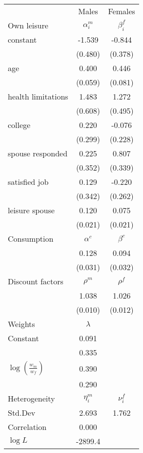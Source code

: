 \begin{tabular}{lcc} 
\hline\hline 
 & Males & Females \\ 
Own leisure & $\alpha_{i}^{m}$ & $\beta_{i}^{f}$ \\ 
constant & -1.539 & -0.844 \\ 
 & (0.480) & (0.378) \\ 
age & 0.400 & 0.446 \\ 
 & (0.059) & (0.081) \\ 
health limitations & 1.483 & 1.272 \\ 
 & (0.608) & (0.495) \\ 
college & 0.220 & -0.076 \\ 
 & (0.299) & (0.228) \\ 
spouse responded & 0.225 & 0.807 \\ 
 & (0.352) & (0.339) \\ 
satisfied job & 0.129 & -0.220 \\ 
 & (0.342) & (0.262) \\ 
leisure spouse & 0.120 & 0.075 \\ 
 & (0.021) & (0.021) \\ 
Consumption & $\alpha^{c}$ & $\beta^{c}$ \\ 
 & 0.128 & 0.094 \\ 
 & (0.031) & (0.032) \\ 
Discount factors & $\rho^m$ & $\rho^f$ \\ 
 & 1.038 & 1.026 \\ 
 & (0.010) & (0.012) \\ 
Weights & $\lambda$ &  \\ 
Constant & 0.091 &  \\ 
 & 0.335 &  \\ 
$\log(\frac{w_m}{w_f})$ & 0.390 &  \\ 
 & 0.290 &  \\ 
Heterogeneity & $\eta_i^m$ & $\nu_i^f$ \\ 
Std.Dev & 2.693 & 1.762 \\ 
Correlation & 0.000 &  \\ 
\hline 
$\log L$ & -2899.4 & \\ 
\hline \hline 
\end{tabular} 
